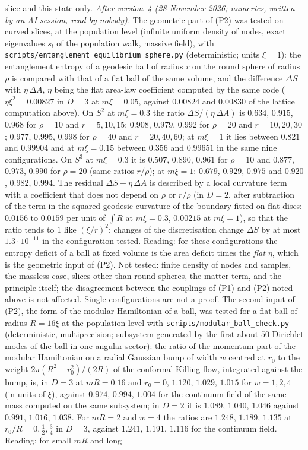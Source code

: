 \documentclass[11pt,a4paper]{article}
\theoremstyle{stmt}
\theoremstyle{defn}
\theoremstyle{rmk}
\numberwithin{equation}{section}
\begin{document}
slice and this state only. \emph{After version~4 (28 November 2026; numerics, written by an AI session, read by nobody).} The geometric part of \textup{(P2)} was tested on curved slices, at the population level (infinite uniform density of nodes, exact eigenvalues $s_l$ of the population walk, massive field), with \texttt{scripts/entanglement\_equilibrium\_sphere.py} (deterministic; units $\xi=1$): the entanglement entropy of a geodesic ball of radius $r$ on the round sphere of radius $\rho$ is compared with that of a flat ball of the same volume, and the difference $\Delta S$ with $\eta\,\Delta A$, $\eta$ being the flat area-law coefficient computed by the same code ($\eta\xi^2=0.00827$ in $D=3$ at $m\xi=0.05$, against $0.00824$ and $0.00830$ of the lattice computation above). On $S^2$ at $m\xi=0.3$ the ratio $\Delta S/(\eta\,\Delta A)$ is $0.634$, $0.915$, $0.968$ for $\rho=10$ and $r=5,10,15$; $0.908$, $0.979$, $0.992$ for $\rho=20$ and $r=10,20,30$; $0.977$, $0.995$, $0.998$ for $\rho=40$ and $r=20,40,60$; at $m\xi=1$ it lies between $0.821$ and $0.99904$ and at $m\xi=0.15$ between $0.356$ and $0.99651$ in the same nine configurations. On $S^3$ at $m\xi=0.3$ it is $0.507$, $0.890$, $0.961$ for $\rho=10$ and $0.877$, $0.973$, $0.990$ for $\rho=20$ (same ratios $r/\rho$); at $m\xi=1$: $0.679$, $0.929$, $0.975$ and $0.920$, $0.982$, $0.994$. The residual $\Delta S-\eta\,\Delta A$ is described by a local curvature term with a coefficient that does not depend on $\rho$ or $r/\rho$ (in $D=2$, after subtraction of the term in the squared geodesic curvature of the boundary fitted on flat discs: $0.0156$ to $0.0159$ per unit of $\int R$ at $m\xi=0.3$, $0.00215$ at $m\xi=1$), so that the ratio tends to $1$ like $(\xi/r)^2$; changes of the discretisation change $\Delta S$ by at most $1.3\cdot10^{-11}$ in the configuration tested. Reading: for these configurations the entropy deficit of a ball at fixed volume is the area deficit times the \emph{flat} $\eta$, which is the geometric input of \textup{(P2)}. Not tested: finite density of nodes and samples, the massless case, slices other than round spheres, the matter term, and the principle itself; the disagreement between the couplings of \textup{(P1)} and \textup{(P2)} noted above is not affected. Single configurations are not a proof. The second input of \textup{(P2)}, the form of the modular Hamiltonian of a ball, was tested for a flat ball of radius $R=16\xi$ at the population level with \texttt{scripts/modular\_ball\_check.py} (deterministic, multiprecision; subsystem generated by the first about $50$ Dirichlet modes of the ball in one angular sector): the ratio of the momentum part of the modular Hamiltonian on a radial Gaussian bump of width $w$ centred at $r_0$ to the weight $2\pi(R^2-r_0^2)/(2R)$ of the conformal Killing flow, integrated against the bump, is, in $D=3$ at $mR=0.16$ and $r_0=0$, $1.120$, $1.029$, $1.015$ for $w=1,2,4$ (in units of $\xi$), against $0.974$, $0.994$, $1.004$ for the continuum field of the same mass computed on the same subsystem; in $D=2$ it is $1.089$, $1.040$, $1.046$ against $0.991$, $1.016$, $1.038$. For $mR=2$ and $w=4$ the ratios are $1.248$, $1.189$, $1.135$ at $r_0/R=0,\tfrac12,\tfrac34$ in $D=3$, against $1.241$, $1.191$, $1.116$ for the continuum field. Reading: for small $mR$ and long 
\end{document}
